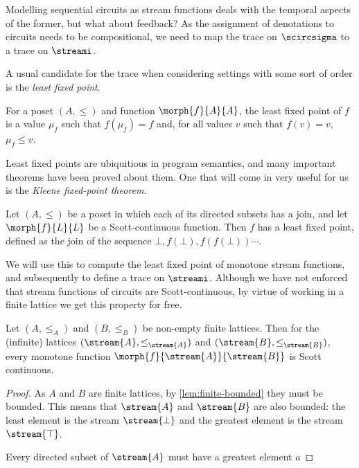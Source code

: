 Modelling sequential circuits as stream functions deals with the temporal
aspects of the former, but what about feedback?
As the assignment of denotations to circuits needs to be compositional, we need
to map the trace on \(\scircsigma\) to a trace on \(\streami\).

A usual candidate for the trace when considering settings with some sort of
order is the \emph{least fixed point}.

\begin{definition}
    For a poset \((A, \leq)\) and function \(\morph{f}{A}{A}\), the least
    fixed point of \(f\) is a value \(\mu_f\) such that \(f(\mu_f) = f\) and,
    for all values \(v\) such that \(f(v) = v\), \(\mu_f \leq v\).
\end{definition}

Least fixed points are ubiquitious in program semantics, and many important
theorems have been proved about them.
One that will come in very useful for us is the
\emph{Kleene fixed-point theorem}.



\begin{theorem}
    Let \((A, \leq)\) be a poset in which each of its directed subsets has a
    join, and let \(\morph{f}{L}{L}\) be a Scott-continuous function.
    Then \(f\) has a least fixed point, defined as the join of the sequence
    \(\bot, f(\bot), f(f(\bot)) \cdots\).
\end{theorem}

We will use this to compute the least fixed point of monotone stream functions,
and subsequently to define a trace on \(\streami\).
Although we have not enforced that stream functions of circuits are
Scott-continuous, by virtue of working in a finite lattice we get this property
for free.

\begin{lemma}\label{lem:finite-monotone-scott}
    Let \((A, \leq_A)\) and \((B, \leq_B)\) be non-empty finite lattices.
    Then for the (infinite) lattices
    \((\stream{A}, \leq_{\stream{A}})\) and
    \((\stream{B}, \leq_{\stream{B}})\), every monotone function
    \(\morph{f}{\stream{A}}{\stream{B}}\) is Scott continuous.
\end{lemma}
\begin{proof}
    As \(A\) and \(B\) are finite lattices, by \cref{lem:finite-bounded} they
    must be bounded.
    This means that \(\stream{A}\) and \(\stream{B}\) are also bounded: the
    least element is the stream \(\stream{\bot}\) and the greatest element is
    the stream \(\stream{\top}\).

    Every directed subset of \(\stream{A}\) must have a greatest element \(a\)


\end{proof}

